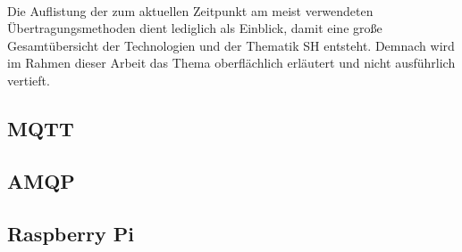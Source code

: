     \\
    Die Auflistung der zum aktuellen Zeitpunkt am meist verwendeten Übertragungsmethoden dient 
    lediglich als Einblick, damit eine große Gesamtübersicht der Technologien und der Thematik \acl{SH} entsteht. 
    Demnach wird im Rahmen dieser Arbeit das Thema oberflächlich erläutert und nicht ausführlich vertieft.


    \subsection{MQTT}
    \label{subsec:mqtt}



    \subsection{AMQP}
    \label{subsec:amqp}

    
    \subsection{Raspberry Pi}
    \label{subsec:raspberrypi} 
